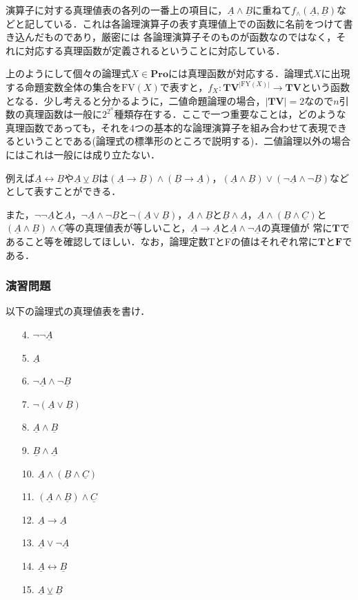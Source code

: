 \documentclass{ltjsarticle}
\theoremstyle{mystyle1}
\theoremstyle{mystyle2}
\newcommand{\uA}{\underline{A}}
\newcommand{\uB}{\underline{B}}
\newcommand{\uC}{\underline{C}}
\newcommand{\bT}{\ensuremath{\mathbf{T}}}
\newcommand{\bF}{\ensuremath{\mathbf{F}}}
\newcommand{\bV}{\ensuremath{\mathbf{V}}}
\newcommand{\bPro}{\ensuremath{\mathbf{Pro}}}
\newcommand{\red}[1]{{\color{red} #1}}
\begin{document}
演算子に対する真理値表の各列の一番上の項目に，$\uA\wedge\uB$に重ねて$f_\wedge\left(\uA,\uB\right)$などと記している．これは各論理演算子の表す真理値上での函数に名前をつけて書き込んだものであり，厳密には\red{各論理演算子そのものが函数なのではなく，それに対応する真理函数が定義される}ということに対応している．

上のようにして個々の論理式$X\in\bPro$には真理函数が対応する．論理式$X$に出現する命題変数全体の集合を$\mathrm{FV}\left(X\right)$で表すと，$f_X : \bT\bV^{|\textrm{FY}\left(X\right)|}\to\bT\bV$という函数となる．少し考えると分かるように，二値命題論理の場合，$|\bT\bV| = 2$なので$n$引数の真理函数は一般に$2^{2^n}$種類存在する．ここで一つ重要なことは，どのような真理函数であっても，それを4つの基本的な論理演算子を組み合わせて表現できるということである(論理式の標準形のところで説明する)．二値論理以外の場合にはこれは一般には成り立たない．

例えば$\uA\leftrightarrow\uB$や$\uA\veebar\uB$は$\left(\uA\to\uB\right)\wedge\left(\uB\to\uA\right)$，$\left(\uA\wedge\uB\right)\vee\left(\neg\uA\wedge\neg\uB\right)$などとして表すことができる．

また，$\neg\neg\uA$と$\uA$，$\neg\uA\wedge\neg\uB$と$\neg\left(\uA\vee\uB\right)$，$\uA\wedge\uB$と$\uB\wedge\uA$，$\uA\wedge\left(\uB\wedge\uC\right)$と$\left(\uA\wedge\uB\right)\wedge\uC$等の真理値表が等しいこと，$\uA\to\uA$と$\uA\wedge\neg\uA$の真理値が 常に$\bT$であること等を確認してほしい．なお，論理定数TとFの値はそれぞれ常に$\bT$と$\bF$である．
\subsubsection*{演習問題}
以下の論理式の真理値表を書け．
\begin{enumerate}
  \item[4.] $\neg\neg\uA$
  \item[5.] $\uA$
  \item[6.] $\neg\uA\wedge\neg\uB$
  \item[7.] $\neg\left(\uA\vee\uB\right)$
  \item[8.] $\uA\wedge\uB$
  \item[9.] $\uB\wedge\uA$
  \item[10.] $\uA\wedge\left(\uB\wedge\uC\right)$
  \item[11.] $\left(\uA\wedge\uB\right)\wedge\uC$
  \item[12.] $\uA\to\uA$
  \item[13.] $\uA\vee\neg\uA$
  \item[14.] $\uA\leftrightarrow\uB$
  \item[15.] $\uA\veebar\uB$
\end{enumerate}
\end{document}
